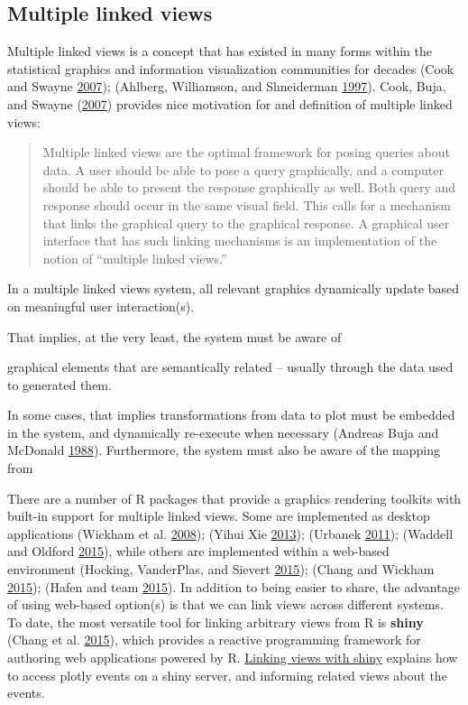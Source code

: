\documentclass[12pt,]{isuthesis}
\begin{document}
\hypertarget{multiple-linked-views}{\subsection{Multiple linked
views}\label{multiple-linked-views}}

Multiple linked views is a concept that has existed in many forms within
the statistical graphics and information visualization communities for
decades (Cook and Swayne \protect\hyperlink{ref-ggobi:2007}{2007});
(Ahlberg, Williamson, and Shneiderman
\protect\hyperlink{ref-Ahlberg:1997tb}{1997}). Cook, Buja, and Swayne
(\protect\hyperlink{ref-Cook:2007uk}{2007}) provides nice motivation for
and definition of multiple linked views:

\begin{quote}
Multiple linked views are the optimal framework for posing queries about
data. A user should be able to pose a query graphically, and a computer
should be able to present the response graphically as well. Both query
and response should occur in the same visual field. This calls for a
mechanism that links the graphical query to the graphical response. A
graphical user interface that has such linking mechanisms is an
implementation of the notion of ``multiple linked views.''
\end{quote}

In a multiple linked views system, all relevant graphics dynamically
update based on meaningful user interaction(s).

That implies, at the very least, the system must be aware of

graphical elements that are semantically related -- usually through the
data used to generated them.

In some cases, that implies transformations from data to plot must be
embedded in the system, and dynamically re-execute when necessary
(Andreas Buja and McDonald
\protect\hyperlink{ref-viewing-pipeline}{1988}). Furthermore, the system
must also be aware of the mapping from

There are a number of R packages that provide a graphics rendering
toolkits with built-in support for multiple linked views. Some are
implemented as desktop applications (Wickham et al.
\protect\hyperlink{ref-rggobi}{2008}); (Yihui Xie
\protect\hyperlink{ref-cranvas}{2013}); (Urbanek
\protect\hyperlink{ref-iPlots}{2011}); (Waddell and Oldford
\protect\hyperlink{ref-loon}{2015}), while others are implemented within
a web-based environment (Hocking, VanderPlas, and Sievert
\protect\hyperlink{ref-animint}{2015}); (Chang and Wickham
\protect\hyperlink{ref-ggvis}{2015}); (Hafen and team
\protect\hyperlink{ref-rbokeh}{2015}). In addition to being easier to
share, the advantage of using web-based option(s) is that we can link
views across different systems. To date, the most versatile tool for
linking arbitrary views from R is \textbf{shiny} (Chang et al.
\protect\hyperlink{ref-shiny}{2015}), which provides a reactive
programming framework for authoring web applications powered by R.
\protect\hyperlink{linking-views-with-shiny}{Linking views with shiny}
explains how to access plotly events on a shiny server, and informing
related views about the events.
\end{document}
